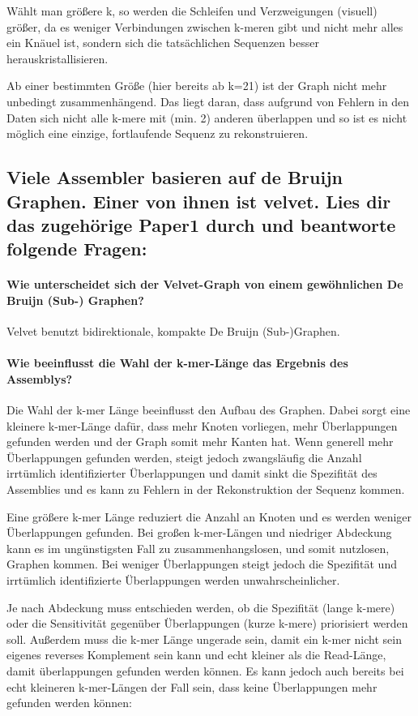 \documentclass[11pt,a4paper]{article}
\begin{document}
    Wählt man größere k, so werden die Schleifen und Verzweigungen (visuell) größer, da es weniger Verbindungen zwischen k-meren gibt und nicht mehr alles ein Knäuel ist, sondern sich die tatsächlichen Sequenzen besser herauskristallisieren.

    Ab einer bestimmten Größe (hier bereits ab k=21) ist der Graph nicht mehr unbedingt zusammenhängend. Das liegt daran, dass aufgrund von Fehlern in den Daten sich nicht alle k-mere mit (min. 2) anderen überlappen und so ist es nicht möglich eine einzige, fortlaufende Sequenz zu rekonstruieren.


    \subsection{Viele Assembler basieren auf de Bruijn Graphen. Einer von ihnen ist velvet. Lies dir das zugehörige Paper1 durch und beantworte folgende Fragen:}
    \paragraph{Wie unterscheidet sich der Velvet-Graph von einem gewöhnlichen De Bruijn (Sub-) Graphen?}
    Velvet benutzt bidirektionale, kompakte De Bruijn (Sub-)Graphen.

    \paragraph{Wie beeinflusst die Wahl der k-mer-Länge das Ergebnis des Assemblys?}
    Die Wahl der k-mer Länge beeinflusst den Aufbau des Graphen. Dabei sorgt eine kleinere k-mer-Länge dafür, dass mehr Knoten vorliegen, mehr Überlappungen gefunden werden und der Graph somit mehr Kanten hat. Wenn generell mehr Überlappungen gefunden werden, steigt jedoch zwangsläufig die Anzahl irrtümlich identifizierter Überlappungen und damit sinkt die Spezifität des Assemblies und es kann zu Fehlern in der Rekonstruktion der Sequenz kommen.

    Eine größere k-mer Länge reduziert die Anzahl an Knoten und es werden weniger Überlappungen gefunden. Bei großen k-mer-Längen und niedriger Abdeckung kann es im ungünstigsten Fall zu zusammenhangslosen, und somit nutzlosen, Graphen kommen. Bei weniger Überlappungen steigt jedoch die Spezifität und irrtümlich identifizierte Überlappungen werden unwahrscheinlicher.

    Je nach Abdeckung muss entschieden werden, ob die Spezifität (lange k-mere) oder die Sensitivität gegenüber Überlappungen (kurze k-mere) priorisiert werden soll. Außerdem muss die k-mer Länge ungerade sein, damit ein k-mer nicht sein eigenes reverses Komplement sein kann und echt kleiner als die Read-Länge, damit überlappungen gefunden werden können. Es kann jedoch auch bereits bei echt kleineren k-mer-Längen der Fall sein, dass keine Überlappungen mehr gefunden werden können:
\end{document}
